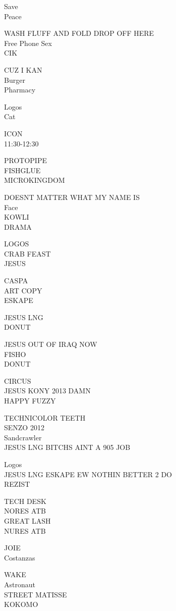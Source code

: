 \documentclass[10pt,letterpaper]{article}
\begin{document}
Save\\
Peace

WASH FLUFF AND FOLD DROP OFF HERE\\
Free Phone Sex\\
CIK

CUZ I KAN\\
Burger\\
Pharmacy

Logos\\
Cat

ICON\\
11:30{-}12:30

PROTOPIPE\\
FISHGLUE\\
MICROKINGDOM

DOESNT MATTER WHAT MY NAME IS\\
Face\\
KOWLI\\
DRAMA

LOGOS\\
CRAB FEAST\\
JESUS

CASPA\\
ART COPY\\
ESKAPE

JESUS LNG\\
DONUT

JESUS OUT OF IRAQ NOW\\
FISHO\\
DONUT

CIRCUS\\
JESUS KONY 2013 DAMN\\
HAPPY FUZZY

TECHNICOLOR TEETH\\
SENZO 2012\\
Sandcrawler\\
JESUS LNG BITCHS AINT A 905 JOB

Logos\\
JESUS LNG ESKAPE EW NOTHIN BETTER 2 DO\\
REZIST

TECH DESK\\
NORES ATB\\
GREAT LASH\\
NURES ATB

JOIE\\
Costanzas

WAKE\\
Astronaut\\
STREET MATISSE\\
KOKOMO
\end{document}
